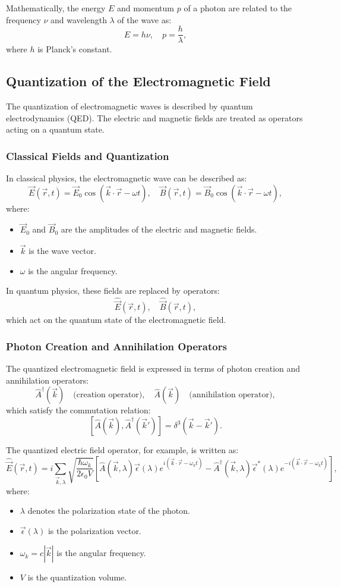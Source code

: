 Mathematically, the energy $E$ and momentum $p$ of a photon are related to the frequency $\nu$ and wavelength $\lambda$ of the wave as:
\[
E = h \nu, \quad p = \frac{h}{\lambda},
\]
where $h$ is Planck's constant.

\subsection*{Quantization of the Electromagnetic Field}
The quantization of electromagnetic waves is described by quantum electrodynamics (QED). The electric and magnetic fields are treated as operators acting on a quantum state.

\subsubsection{Classical Fields and Quantization}
In classical physics, the electromagnetic wave can be described as:
\[
\vec{E}(\vec{r}, t) = \vec{E}_0 \cos(\vec{k} \cdot \vec{r} - \omega t),
\quad
\vec{B}(\vec{r}, t) = \vec{B}_0 \cos(\vec{k} \cdot \vec{r} - \omega t),
\]
where:
\begin{itemize}
    \item $\vec{E}_0$ and $\vec{B}_0$ are the amplitudes of the electric and magnetic fields.
    \item $\vec{k}$ is the wave vector.
    \item $\omega$ is the angular frequency.
\end{itemize}

In quantum physics, these fields are replaced by operators:
\[
\hat{\vec{E}}(\vec{r}, t), \quad \hat{\vec{B}}(\vec{r}, t),
\]
which act on the quantum state of the electromagnetic field.

\subsubsection{Photon Creation and Annihilation Operators}
The quantized electromagnetic field is expressed in terms of photon creation and annihilation operators:
\[
\hat{A}^\dagger(\vec{k}) \quad \text{(creation operator)},
\quad
\hat{A}(\vec{k}) \quad \text{(annihilation operator)},
\]
which satisfy the commutation relation:
\[
[\hat{A}(\vec{k}), \hat{A}^\dagger(\vec{k}')] = \delta^3(\vec{k} - \vec{k}').
\]

The quantized electric field operator, for example, is written as:
\[
\hat{\vec{E}}(\vec{r}, t) = i \sum_{\vec{k}, \lambda} \sqrt{\frac{\hbar \omega_k}{2 \epsilon_0 V}}
\left[
\hat{A}(\vec{k}, \lambda) \vec{\epsilon}(\lambda) e^{i (\vec{k} \cdot \vec{r} - \omega_k t)} 
- \hat{A}^\dagger(\vec{k}, \lambda) \vec{\epsilon}^*(\lambda) e^{-i (\vec{k} \cdot \vec{r} - \omega_k t)}
\right],
\]
where:
\begin{itemize}
    \item $\lambda$ denotes the polarization state of the photon.
    \item $\vec{\epsilon}(\lambda)$ is the polarization vector.
    \item $\omega_k = c |\vec{k}|$ is the angular frequency.
    \item $V$ is the quantization volume.
\end{itemize}

